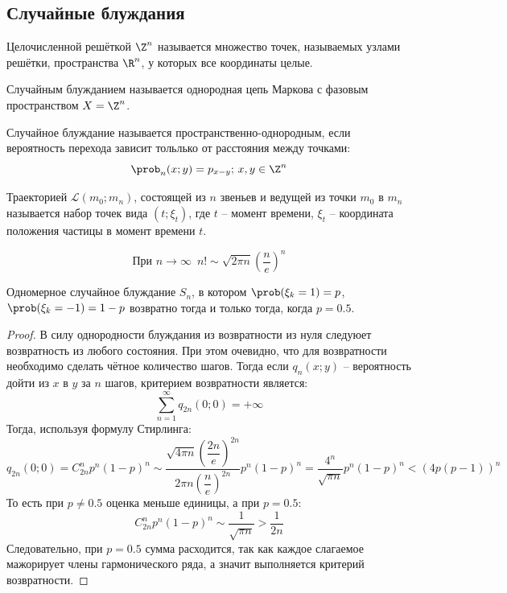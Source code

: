 \documentclass[12pt]{article}
\begin{document}
\subsection{Случайные блуждания}

\begin{definition}
    Целочисленной решёткой $\Z^n$ называется множество точек, называемых узлами решётки, пространства $\R^n$, у которых все координаты целые.
\end{definition}
\begin{definition}
    Случайным блужданием называется однородная цепь Маркова с фазовым пространством $X=\Z^n$.
\end{definition}
\begin{definition}
    Случайное блуждание называется пространственно-однородным, если вероятность перехода зависит тольлько от расстояния между точками:
    $$\prob_n(x;y)=p_{x-y};\,x,y\in\Z^n$$
\end{definition}
\begin{definition}
    Траекторией $\mathcal{L}(m_0;m_n)$, состоящей из $n$ звеньев и ведущей из точки $m_0$ в $m_n$ называется набор точек вида $(t;\xi_t)$, где $t$ -- момент времени, $\xi_t$ -- координата положения частицы в момент времени $t$.
\end{definition}
\begin{theorem}
    $$\text{При }n\to\infty\enspace n!\sim \sqrt{2\pi n}\left(\frac{n}{e}\right)^n$$
\end{theorem}
\begin{theorem}
    Одномерное случайное блуждание $S_n$, в котором $\prob(\xi_k=1)=p$, $\prob(\xi_k=-1)=1-p$ возвратно тогда и только тогда, когда $p=\num{0.5}$.
\end{theorem}
\begin{proof}
    В силу однородности блуждания из возвратности из нуля следуюет возвратность из любого состояния. При этом очевидно, что для возвратности необходимо сделать чётное количество шагов. Тогда если $q_n(x;y)$ -- вероятность дойти из $x$ в $y$ за $n$ шагов, критерием возвратности является:
    $$\sum_{n=1}^\infty q_{2n}(0;0)=+\infty$$
    Тогда, используя формулу Стирлинга:
    $$q_{2n}(0;0)=C_{2n}^np^n(1-p)^n\sim \frac{\sqrt{4\pi n}\left(\dfrac{2n}{e}\right)^{2n}}{2\pi n\left(\dfrac{n}{e}\right)^{2n}}p^n(1-p)^n=\frac{4^n}{\sqrt{\pi n}}p^n(1-p)^n<(4p(p-1))^n$$
    То есть при $p\neq\num{0.5}$ оценка меньше единицы, а при $p=\num{0.5}$:
    $$C_{2n}^np^n(1-p)^n\sim \frac{1}{\sqrt{\pi n}}>\frac{1}{2n}$$
    Следовательно, при $p=\num{0.5}$ сумма расходится, так как каждое слагаемое мажорирует члены гармонического ряда, а значит выполняется критерий возвратности.
\end{proof}
\end{document}
